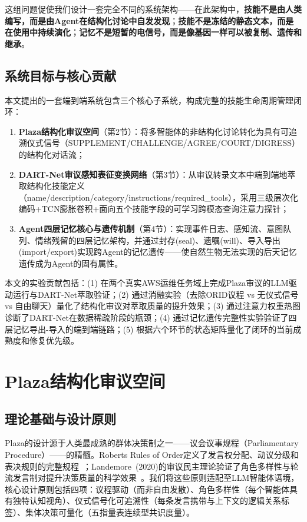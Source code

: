 \documentclass[twocolumn,10.5pt]{ctexart}
\begin{document}
这组问题促使我们设计一套完全不同的系统架构——在此架构中，\textbf{技能不是由人类编写，而是由Agent在结构化讨论中自发发现}；\textbf{技能不是冻结的静态文本，而是在使用中持续演化}；\textbf{记忆不是短暂的电信号，而是像基因一样可以被复制、遗传和继承}。

\subsection{系统目标与核心贡献}

本文提出的一套端到端系统包含三个核心子系统，构成完整的技能生命周期管理闭环：

\begin{enumerate}[itemsep=0pt,topsep=0pt]
  \item \textbf{Plaza结构化审议空间}（第2节）：将多智能体的非结构化讨论转化为具有可追溯仪式信号（SUPPLEMENT/CHALLENGE/AGREE/COURT/DIGRESS）的结构化对话流；
  \item \textbf{DART-Net审议感知表征变换网络}（第3节）：从审议转录文本中端到端地萃取结构化技能定义（name/description/category/instructions/required\_tools），采用三级层次化编码+TCN膨胀卷积+面向五个技能字段的可学习跨模态查询注意力探针；
  \item \textbf{Agent四层记忆核心与遗传机制}（第4节）：实现事件日志、感知流、意图队列、情绪残留的四层记忆架构，并通过封存(seal)、遗嘱(will)、导入导出(import/export)实现跨Agent的记忆遗传——使自然生物无法实现的后天记忆遗传成为Agent的固有属性。
\end{enumerate}

本文的实验贡献包括：(1) 在两个真实AWS运维任务域上完成Plaza审议的LLM驱动运行与DART-Net萃取验证；(2) 通过消融实验（去除ORID议程 vs 无仪式信号 vs 自由聊天）量化了结构化审议对萃取质量的提升效果；(3) 通过注意力权重热图诊断了DART-Net在数据稀疏阶段的瓶颈；(4) 通过记忆遗传完整性实验验证了四层记忆导出-导入的端到端链路；(5) 根据六个环节的状态矩阵量化了闭环的当前成熟度和修复优先级。

\section{Plaza结构化审议空间}

\subsection{理论基础与设计原则}

Plaza的设计源于人类最成熟的群体决策制之一——议会议事规程（Parliamentary Procedure）——的精髓。Roberts Rules of Order定义了发言权分配、动议分级和表决规则的完整规程~\cite{robert2020rules}；Landemore~(2020)的审议民主理论验证了角色多样性与轮流发言制对提升决策质量的科学效果~\cite{landemore2020open}。我们将这些原则适配至LLM智能体语境，核心设计原则包括四项：议程驱动（而非自由发散）、角色多样性（每个智能体具有独特认知视角）、仪式信号化可追溯性（每条发言携带与上下文的逻辑关系标签）、集体决策可量化（五指量表连续型共识度量）。
\end{document}
